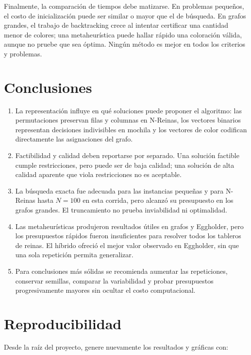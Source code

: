 \documentclass[12pt,letterpaper]{article}
\begin{document}
Finalmente, la comparación de tiempos debe matizarse. En problemas pequeños,
el costo de inicialización puede ser similar o mayor que el de búsqueda. En
grafos grandes, el trabajo de backtracking crece al intentar certificar una
cantidad menor de colores; una metaheurística puede hallar rápido una
coloración válida, aunque no pruebe que sea óptima. Ningún método es mejor en
todos los criterios y problemas.

\section{Conclusiones}

\begin{enumerate}[leftmargin=1.7em]
  \item La representación influye en qué soluciones puede proponer el
  algoritmo: las permutaciones preservan filas y columnas en N-Reinas, los
  vectores binarios representan decisiones indivisibles en mochila y los
  vectores de color codifican directamente las asignaciones del grafo.
  \item Factibilidad y calidad deben reportarse por separado. Una solución
  factible cumple restricciones, pero puede ser de baja calidad; una solución
  de alta calidad aparente que viola restricciones no es aceptable.
  \item La búsqueda exacta fue adecuada para las instancias pequeñas y para
  N-Reinas hasta $N=100$ en esta corrida, pero alcanzó su presupuesto en los
  grafos grandes. El truncamiento no prueba inviabilidad ni optimalidad.
  \item Las metaheurísticas produjeron resultados útiles en grafos y
  Eggholder, pero los presupuestos rápidos fueron insuficientes para resolver
  todos los tableros de reinas. El híbrido ofreció el mejor valor observado en
  Eggholder, sin que una sola repetición permita generalizar.
  \item Para conclusiones más sólidas se recomienda aumentar las repeticiones,
  conservar semillas, comparar la variabilidad y probar presupuestos
  progresivamente mayores sin ocultar el costo computacional.
\end{enumerate}

\section*{Reproducibilidad}

Desde la raíz del proyecto, genere nuevamente los resultados y gráficas con:
\end{document}
